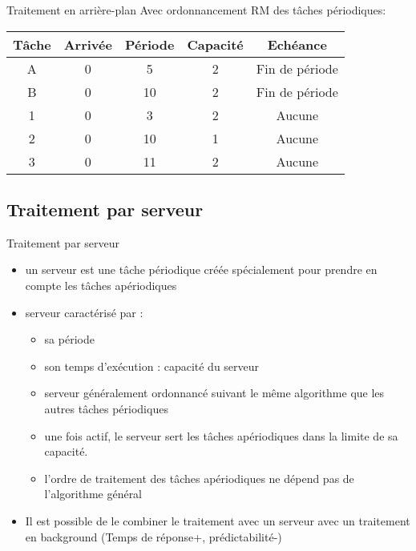\begin{frame}{Traitement en arrière-plan} 
  Avec ordonnancement RM des tâches périodiques:
  \begin{center}
    \begin{tabular}{ccccc}
      \hline
      Tâche & Arrivée & Période & Capacité & Echéance \\
      \hline
      A & 0 &  5 & 2 & Fin de période\\
      B & 0 & 10 & 2 & Fin de période\\
      1 & 0 &  3 & 2 & Aucune\\
      2 & 0 & 10 & 1 & Aucune\\
      3 & 0 & 11 & 2 & Aucune\\
      \hline
    \end{tabular}
  \end{center}
  
\end{frame} 

\subsection{Traitement par serveur}

\begin{frame}{Traitement par serveur} 
  \begin{itemize}
  \item un  serveur est une  tâche périodique créée  spécialement pour
    prendre en compte les tâches apériodiques
  \item serveur caractérisé par :
    \begin{itemize}
    \item sa période 
    \item son temps d'exécution : capacité du serveur  
    \item serveur  généralement ordonnancé suivant  le même algorithme
      que les autres tâches périodiques
    \item une fois actif, le serveur sert les tâches apériodiques dans
      la limite de sa capacité.
    \item l'ordre de traitement  des tâches apériodiques ne dépend pas
      de l'algorithme général
    \end{itemize}
  \item Il est  possible de le combiner le  traitement avec un serveur
    avec   un   traitement   en   background   (Temps   de   réponse+,
    prédictabilité-)
  \end{itemize}
\end{frame}

